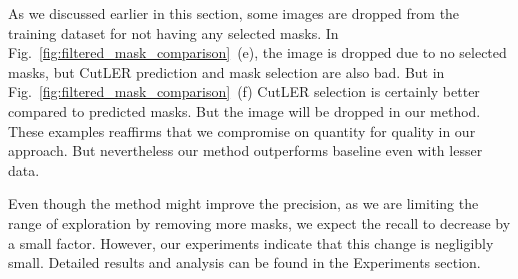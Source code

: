 As we discussed earlier in this section, some images are dropped from the training dataset for not having any selected masks. In Fig.~\ref{fig:filtered_mask_comparison}~(e), the image is dropped due to no selected masks, but CutLER prediction and mask selection are also bad. But in Fig.~\ref{fig:filtered_mask_comparison}~(f) CutLER selection is certainly better compared to predicted masks. But the image will be dropped in our method. These examples reaffirms that we compromise on quantity for quality in our approach. But nevertheless our method outperforms baseline even with lesser data.

Even though the method might improve the precision, as we are limiting the range of exploration by removing more masks, we expect the recall to decrease by a small factor. However, our experiments indicate that this change is negligibly small. Detailed results and analysis can be found in the Experiments section.

